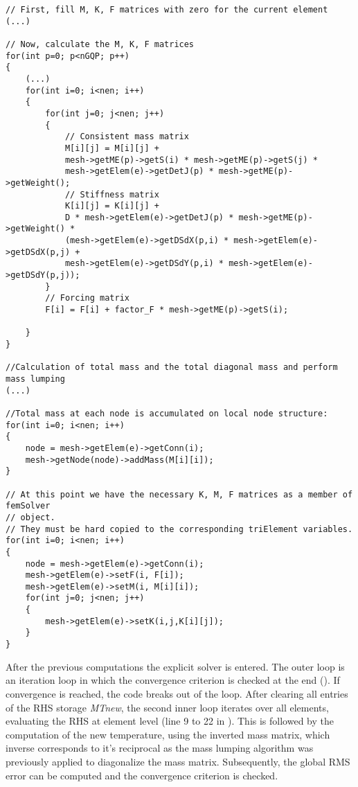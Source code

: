 \begin{lstlisting}[caption={\label{Code:Serial1} Calculation of Element Matrices}]
// First, fill M, K, F matrices with zero for the current element
(...)

// Now, calculate the M, K, F matrices
for(int p=0; p<nGQP; p++)
{   
	(...)
	for(int i=0; i<nen; i++)
	{
		for(int j=0; j<nen; j++)
		{
			// Consistent mass matrix
			M[i][j] = M[i][j] +
			mesh->getME(p)->getS(i) * mesh->getME(p)->getS(j) *
			mesh->getElem(e)->getDetJ(p) * mesh->getME(p)->getWeight();
			// Stiffness matrix
			K[i][j] = K[i][j] +
			D * mesh->getElem(e)->getDetJ(p) * mesh->getME(p)->getWeight() *
			(mesh->getElem(e)->getDSdX(p,i) * mesh->getElem(e)->getDSdX(p,j) +
			mesh->getElem(e)->getDSdY(p,i) * mesh->getElem(e)->getDSdY(p,j));
		}
		// Forcing matrix
		F[i] = F[i] + factor_F * mesh->getME(p)->getS(i);
		
	}
}

//Calculation of total mass and the total diagonal mass and perform mass lumping
(...)

//Total mass at each node is accumulated on local node structure:
for(int i=0; i<nen; i++)
{
	node = mesh->getElem(e)->getConn(i);
	mesh->getNode(node)->addMass(M[i][i]);
}

// At this point we have the necessary K, M, F matrices as a member of femSolver 
// object.
// They must be hard copied to the corresponding triElement variables.
for(int i=0; i<nen; i++)
{
	node = mesh->getElem(e)->getConn(i);
	mesh->getElem(e)->setF(i, F[i]);
	mesh->getElem(e)->setM(i, M[i][i]);
	for(int j=0; j<nen; j++)
	{
		mesh->getElem(e)->setK(i,j,K[i][j]);
	}
}
\end{lstlisting}

After the previous computations the explicit solver is entered. The outer loop is an iteration loop in which the convergence criterion  is checked at the end (). If convergence is reached, the code breaks out of the loop. After clearing all entries of the RHS storage \textit{MTnew}, the second inner loop iterates over all elements, evaluating the RHS at element level (line 9 to 22 in ). This is followed by the computation of the new temperature, using the inverted mass matrix, which inverse corresponds to it's reciprocal as the mass lumping algorithm was previously applied to diagonalize the mass matrix. Subsequently, the global RMS error can be computed and the convergence criterion  is checked.

